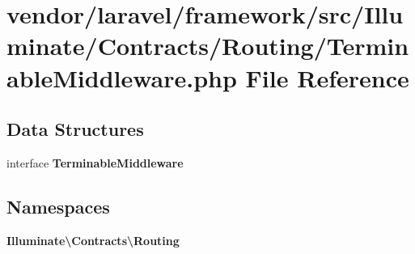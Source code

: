 \section{vendor/laravel/framework/src/\+Illuminate/\+Contracts/\+Routing/\+Terminable\+Middleware.php File Reference}
\label{_terminable_middleware_8php}
\subsection*{Data Structures}
\begin{DoxyCompactItemize}
\item 
interface {\bf Terminable\+Middleware}
\end{DoxyCompactItemize}
\subsection*{Namespaces}
\begin{DoxyCompactItemize}
\item 
 {\bf Illuminate\textbackslash{}\+Contracts\textbackslash{}\+Routing}
\end{DoxyCompactItemize}
